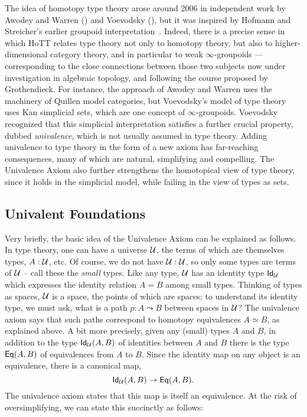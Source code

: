 {The idea of homotopy type theory arose around 2006 in independent work by Awodey and Warren (\cite{AW}) and Voevodsky (\cite{VV}), but it was inspired by 
Hofmann and Streicher's earlier groupoid interpretation~\cite{HofmannM:gromtt}.  Indeed, there is a precise sense in which HoTT relates type theory not only to homotopy theory, but also to higher-dimensional category theory, and in particular to weak $\infty$-groupoids --- corresponding to the close connections between those two subjects now under investigation in algebraic topology, and following the course proposed by Grothendieck.  For instance, the approach of Awodey and Warren uses the machinery of Quillen model categories, but Voevodsky's model of type theory uses Kan simplicial sets, which are one concept of $\infty$-groupoids.  Voevodsky recognized that this simplicial interpretation satisfies a further crucial property, dubbed \emph{univalence},  which is not usually assumed in type theory.  Adding univalence  to type theory in the form of a new axiom has far-reaching consequences, many of which are natural, simplifying and compelling.  The Univalence Axiom also further strengthens the homotopical view of type theory, since it holds in the simplicial model, while failing in the view of types as sets.  

\subsection*{Univalent Foundations}

Very briefly, the basic idea of the Univalence Axiom can be explained as follows.  In type theory, one can have a universe ${\mathcal U}$, the terms of which are themselves types, $A : {\mathcal U}$, etc.  Of course, we do not have ${\mathcal U}:{\mathcal U}$, so only some types are terms of ${\mathcal U}$ -- call these the \emph{small} types.  Like any type, ${\mathcal U}$ has an identity type ${{\sf Id}}_{{\mathcal U}}$ which expresses the identity relation $A = B$ among small types.  Thinking of  types as spaces, ${\mathcal U}$ is a space, the points of which are spaces; to understand its identity type, we must ask, what is a path $p : A \leadsto B$ between spaces in ${\mathcal U}$?  The univalence axiom says that such paths correspond to homotopy equivalences $A\simeq B$, as explained above.  A bit more precisely, given any (small) types $A$ and $B$, in addition to the type ${{\sf Id}}_{{\mathcal U}}(A,B)$ of identities between $A$ and $B$ there is the type ${{\sf Eq}}(A,B)$ of equivalences from $A$ to $B$.  Since the identity map on any object is an equivalence, there is a canonical map,
$${{\sf Id}}_{{\mathcal U}}(A,B)\to{{\sf Eq}}(A,B).$$
The univalence axiom states that this map is itself an equivalence.  At the risk of oversimplifying, we can state this succinctly as follows:

}
